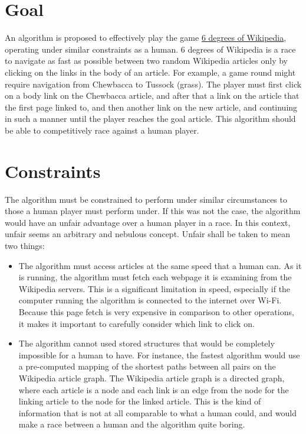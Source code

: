 \documentclass{article}
\begin{document}
\section{Goal}
An algorithm is proposed to effectively play the game
\href{http://en.wikipedia.org/wiki/Wikipedia:Six_degrees_of_Wikipedia}{6 degrees
  of Wikipedia}, operating under similar constraints as a human. 6 degrees of
Wikipedia is a race to navigate as fast as possible between two random Wikipedia
articles only by clicking on the links in the body of an article. For example, a
game round might require navigation from Chewbacca to Tussock (grass). The
player must first click on a body link on the Chewbacca article, and after that
a link on the article that the first page linked to, and
then another link on the new article, and continuing in such a manner until the
player reaches the goal article. This algorithm should be able to competitively
race against a human player.

\section{Constraints}
The algorithm must be constrained to perform under similar circumstances to
those a human player must perform under. If this was not the case, the algorithm
would have an unfair advantage over a human player in a race. In this context,
unfair seems an arbitrary and nebulous concept. Unfair shall be taken to mean
two things:

\begin{itemize}
\item The algorithm must access articles at the same speed that a human can. As
  it is running, the algorithm must fetch each webpage it is examining from the
  Wikipedia servers. This is a significant limitation in speed, especially if
  the computer running the algorithm is connected to the internet over Wi-Fi.
  Because this page fetch is very expensive in comparison to other operations,
  it makes it important to carefully consider which link to click on.

\item The algorithm cannot used stored structures that would be completely
  impossible for a human to have. For instance, the fastest algorithm would use
  a pre-computed mapping of the shortest paths between all pairs on the Wikipedia
  article graph. The Wikipedia article graph is a directed graph, where each
  article is a node and each link is an edge from the node for the linking
  article to the node for the linked article. This is the kind of information
  that is not at all comparable to what a human could, and would make a race
  between a human and the algorithm quite boring. 
\end{itemize}
\end{document}
